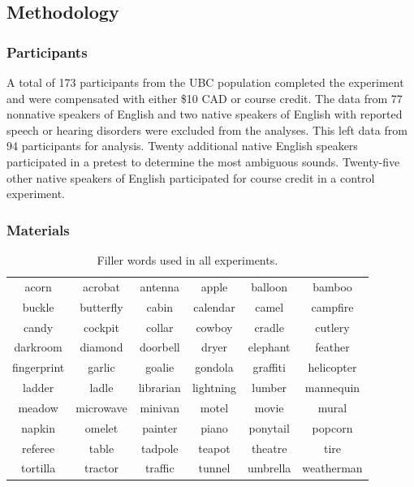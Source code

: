 \subsection{Methodology}

\subsubsection{Participants}

A total of 173 participants from the UBC population completed the experiment and were compensated with either \$10 CAD or course credit.  
The data from 77 nonnative speakers of English and two native speakers of English with reported speech or hearing disorders were excluded from the analyses.
This left data from 94 participants for analysis.
Twenty additional native English speakers participated in a pretest to determine the most ambiguous sounds.  
Twenty-five other native speakers of English participated for course credit in a control experiment.

\subsubsection{Materials}

\begin{table}[ht]
\caption{Filler words used in all experiments.}
\label{tbl:fillerwords}
\centering
\begin{tabular}{cccccc}
\toprule
acorn       & acrobat   & antenna   & apple     & balloon  & bamboo     \\
buckle      & butterfly & cabin     & calendar  & camel    & campfire   \\
candy       & cockpit   & collar    & cowboy    & cradle   & cutlery    \\
darkroom    & diamond   & doorbell  & dryer     & elephant & feather    \\
fingerprint & garlic    & goalie    & gondola   & graffiti & helicopter \\
ladder      & ladle     & librarian & lightning & lumber   & mannequin  \\
meadow      & microwave & minivan   & motel     & movie    & mural      \\
napkin      & omelet    & painter   & piano     & ponytail & popcorn    \\
referee     & table     & tadpole   & teapot    & theatre  & tire       \\
tortilla    & tractor   & traffic   & tunnel    & umbrella & weatherman\\
\bottomrule
\end{tabular}
\end{table}

